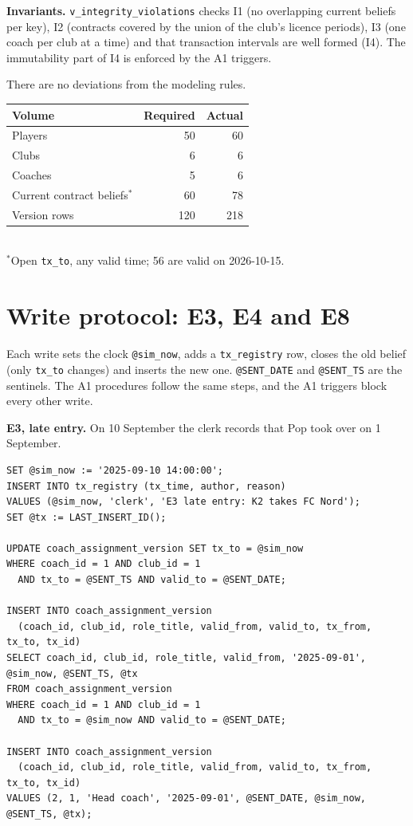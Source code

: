\documentclass[10pt,a4paper]{article}
\newcommand{\code}[1]{\texttt{\small #1}}
\begin{document}
\textbf{Invariants.}  \code{v\_integrity\_violations} checks I1 (no overlapping
current beliefs per key), I2 (contracts covered by the union of the club's licence
periods), I3 (one coach per club at a time) and that transaction intervals are well
formed (I4).  The immutability part of I4 is enforced by the A1 triggers.

There are no deviations from the modeling rules.

\begin{center}
\footnotesize
\begin{tabular}{@{}lrr@{}}
\toprule
Volume & Required & Actual\\
\midrule
Players & 50 & 60\\
Clubs & 6 & 6\\
Coaches & 5 & 6\\
Current contract beliefs$^{*}$ & 60 & 78\\
Version rows & 120 & 218\\
\bottomrule
\end{tabular}\\[2pt]
{\scriptsize $^{*}$Open \code{tx\_to}, any valid time; 56 are valid on 2026-10-15.}
\end{center}

\section{Write protocol: E3, E4 and E8}
Each write sets the clock \code{@sim\_now}, adds a \code{tx\_registry} row, closes
the old belief (only \code{tx\_to} changes) and inserts the new one.
\code{@SENT\_DATE} and \code{@SENT\_TS} are the sentinels.  The A1 procedures follow
the same steps, and the A1 triggers block every other write.

\textbf{E3, late entry.}  On 10 September the clerk records that Pop took over on
1 September.
\begin{lstlisting}
SET @sim_now := '2025-09-10 14:00:00';
INSERT INTO tx_registry (tx_time, author, reason)
VALUES (@sim_now, 'clerk', 'E3 late entry: K2 takes FC Nord');
SET @tx := LAST_INSERT_ID();

UPDATE coach_assignment_version SET tx_to = @sim_now
WHERE coach_id = 1 AND club_id = 1
  AND tx_to = @SENT_TS AND valid_to = @SENT_DATE;

INSERT INTO coach_assignment_version
  (coach_id, club_id, role_title, valid_from, valid_to, tx_from, tx_to, tx_id)
SELECT coach_id, club_id, role_title, valid_from, '2025-09-01', @sim_now, @SENT_TS, @tx
FROM coach_assignment_version
WHERE coach_id = 1 AND club_id = 1
  AND tx_to = @sim_now AND valid_to = @SENT_DATE;

INSERT INTO coach_assignment_version
  (coach_id, club_id, role_title, valid_from, valid_to, tx_from, tx_to, tx_id)
VALUES (2, 1, 'Head coach', '2025-09-01', @SENT_DATE, @sim_now, @SENT_TS, @tx);
\end{lstlisting}
\end{document}
